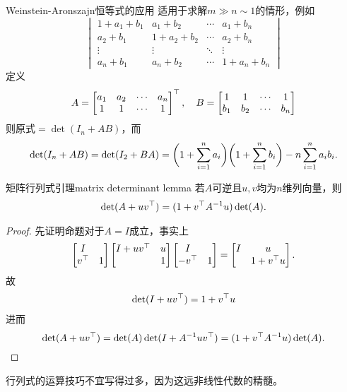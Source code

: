 \begin{example}
	{Weinstein-Aronszajn恒等式的应用}{}
	 适用于求解$m\gg n\sim 1$的情形，例如
	\[
		\begin{vmatrix}
			1+a_1+b_1&a_1+b_2&\cdots&a_1+b_n\\
			a_2+b_1&1+a_2+b_2&\cdots&a_2+b_n\\
			\vdots&\vdots&\ddots&\vdots\\
			a_n+b_1&a_n+b_2&\cdots&1+a_n+b_n
		\end{vmatrix}
	\]
	定义 
	\[
		A=\begin{bmatrix}
			a_1&a_2&\cdots&a_n\\
			1&1&\cdots&1
		\end{bmatrix}^\top,\quad
		B=\begin{bmatrix}
			1&1&\cdots&1\\
			b_1&b_2&\cdots&b_n
		\end{bmatrix}
	\]
	则原式$=\det(I_n+AB)$，而
	\[
		\det(I_n+AB)=\det(I_2+BA)=\biggl(1+\sum_{i=1}^na_i\biggr)\biggl(1+\sum_{i=1}^nb_i\biggr)-n\sum_{i=1}^na_ib_i.
	\]
\end{example}

\begin{theorem}
	{矩阵行列式引理}{matrix determinant lemma}
	若$A$可逆且$u,v$均为$n$维列向量，则
	\begin{align}
		\det(A+uv^\top)=(1+v^\top A^{-1} u)\det(A).
	\end{align}
\end{theorem}
\begin{proof}
	先证明命题对于$A=I$成立，事实上
	\begin{align*}
		\begin{bmatrix}
			I\\v^\top&1
		\end{bmatrix}
		\begin{bmatrix}
			I+uv^\top&u\\ &1
		\end{bmatrix}
		\begin{bmatrix}
			I\\-v^\top&1
		\end{bmatrix}=
		\begin{bmatrix}
			I&u\\ &1+v^\top u
		\end{bmatrix}.
	\end{align*}
	故
	\begin{align}
		\det(I+uv^\top)=1+v^\top u
	\end{align}
	进而 
	\[
		\det(A+uv^\top)=\det(A)\det(I+A^{-1} uv^\top)=(1+v^\top A^{-1} u)\det(A).
		\qedhere
	\]
\end{proof}
\begin{remark}
	行列式的运算技巧不宜写得过多，因为这远非线性代数的精髓。
\end{remark}
